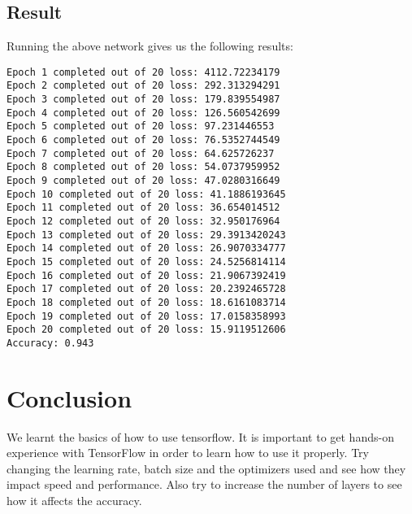 \documentclass[Proceedings]{ascelike}
\begin{document}
\subsection{Result}
Running the above network gives us the following results:

\begin{lstlisting}
Epoch 1 completed out of 20 loss: 4112.72234179
Epoch 2 completed out of 20 loss: 292.313294291
Epoch 3 completed out of 20 loss: 179.839554987
Epoch 4 completed out of 20 loss: 126.560542699
Epoch 5 completed out of 20 loss: 97.231446553
Epoch 6 completed out of 20 loss: 76.5352744549
Epoch 7 completed out of 20 loss: 64.625726237
Epoch 8 completed out of 20 loss: 54.0737959952
Epoch 9 completed out of 20 loss: 47.0280316649
Epoch 10 completed out of 20 loss: 41.1886193645
Epoch 11 completed out of 20 loss: 36.654014512
Epoch 12 completed out of 20 loss: 32.950176964
Epoch 13 completed out of 20 loss: 29.3913420243
Epoch 14 completed out of 20 loss: 26.9070334777
Epoch 15 completed out of 20 loss: 24.5256814114
Epoch 16 completed out of 20 loss: 21.9067392419
Epoch 17 completed out of 20 loss: 20.2392465728
Epoch 18 completed out of 20 loss: 18.6161083714
Epoch 19 completed out of 20 loss: 17.0158358993
Epoch 20 completed out of 20 loss: 15.9119512606
Accuracy: 0.943
\end{lstlisting}

\section{Conclusion}
We learnt the basics of how to use tensorflow. It is important to get hands-on experience with TensorFlow in order to learn how to use it properly. Try changing the learning rate, batch size and the optimizers used and see how they impact speed and performance.
Also try to increase the number of layers to see how it affects the accuracy.
\end{document}
